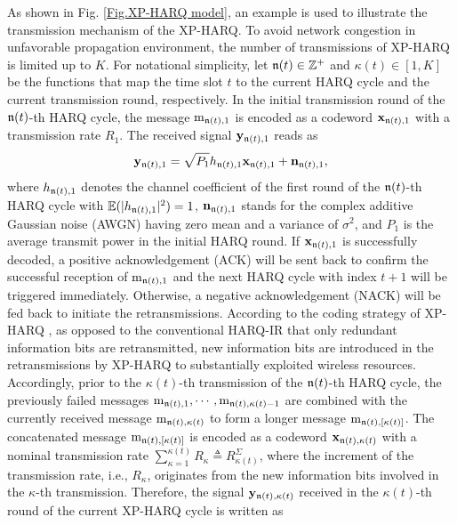 \documentclass[lettersize,journal]{IEEEtran}
\begin{document}
As shown in Fig. \ref{Fig.XP-HARQ model}, an example is used to illustrate the transmission mechanism of the XP-HARQ. To avoid network congestion in unfavorable propagation environment, the number of transmissions of XP-HARQ is limited up to $K$. For notational simplicity, let $\frak{n}(t) \in \mathbb Z^{+}$ and $\kappa(t) \in [1,K]$ be the functions that map the time slot $t$ to the current HARQ cycle and the current transmission round, respectively. In the initial transmission round of the $\frak{n}(t)$-th HARQ cycle, the message ${\rm m}_{\frak{n}(t),1}$ is encoded as a codeword ${\bf x}_{\frak{n}(t),1}$ with a transmission rate $R_1$. The received signal ${\bf y}_{\frak{n}(t),1}$ reads as
\begin{equation}
    {\bf y}_{\frak{n}(t),1} = \sqrt{P_1} h_{\frak{n}(t),1} {\bf x}_{\frak{n}(t),1} + {\bf n}_{\frak{n}(t),1},
\end{equation}
where $h_{\frak{n}(t),1}$ denotes the channel coefficient of the first round of the $\frak{n}(t)$-th HARQ cycle with ${\mathbb E}(|h_{\frak{n}(t),1}|^2)=1$, ${\bf n}_{\frak{n}(t),1}$ stands for the complex additive Gaussian noise (AWGN) having zero mean and a variance of $\sigma^2$, and $P_1$ is the average transmit power in the initial HARQ round. If ${\bf x}_{\frak{n}(t),1}$ is successfully decoded, a positive acknowledgement (ACK) will be sent back to confirm the successful reception of ${\rm m}_{\frak{n}(t),1}$ and the next HARQ cycle with index $t+1$ will be triggered immediately. Otherwise, a negative acknowledgement (NACK) will be fed back to initiate the retransmissions. According to the coding strategy of XP-HARQ \cite{jabi2017adaptive}, as opposed to the conventional HARQ-IR that only redundant information bits are retransmitted, new information bits are introduced in the retransmissions by XP-HARQ to substantially exploited wireless resources. Accordingly, prior to the $\kappa(t)$-th transmission of the $\frak{n}(t)$-th HARQ cycle, the previously failed messages ${\rm m}_{\frak{n}(t),1},\cdots,{\rm m}_{\frak{n}(t),\kappa(t)-1}$ are combined with the currently received message ${\rm m}_{\frak{n}(t),\kappa(t)}$ to form a longer  message ${{\rm m}_{\frak{n}(t),[\kappa(t)]}}$. The concatenated message ${{\rm m}_{\frak{n}(t),[\kappa(t)]}}$ is encoded as a codeword ${\bf x}_{\frak{n}(t),\kappa(t)}$ with a nominal transmission rate $\sum\nolimits_{\kappa=1}^{\kappa(t)} R_{\kappa}\triangleq R_{\kappa(t)}^{\Sigma}$, where the increment of the transmission rate, i.e., $R_{\kappa}$, originates from the new information bits involved in the $\kappa$-th transmission. Therefore, the signal $\mathbf{y}_{\frak{n}(t),\kappa(t)}$ received in the ${\kappa(t)}$-th round of the current XP-HARQ cycle is written as
\end{document}
